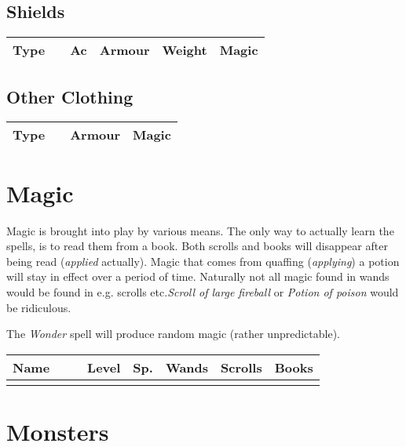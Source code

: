 \documentclass[11pt, a4paper]{article}
\begin{document}
\subsection*{Shields}

{\small 
\begin{center}
\begin{tabular}{|c|c|r|r|r|p{5cm}|}
\hline
Type&&Ac&Armour&Weight&Magic\\
\hline
\hline

\hline
\end{tabular}
\end{center} 
}

\subsection*{Other Clothing}

{\small 
\begin{center}
\begin{tabular}{|c|c|r|l|}
\hline
Type&&Armour&Magic\\
\hline
\hline

\hline
\end{tabular}
\end{center} 
}

\section*{Magic}

Magic is brought into play by various means.  The only way to actually 
learn the spells, is to read them from a book. Both scrolls and books
will disappear after being read ({\em applied} actually). Magic that
comes from quaffing ({\em applying}) a potion will stay in effect over
a period of time. Naturally not all magic found in wands
would be found in e.g. scrolls etc.{\it Scroll of large fireball} or
{\it Potion of poison} would be ridiculous.

The {\it Wonder} spell will produce random magic (rather unpredictable).

{\small 
\begin{longtable}{|l|c|c|r|r|c|c|c|} 
\hline
Name& & &Level&Sp.&Wands&Scrolls&Books\\
\hline 
\hline
\endhead
\hline
\endfoot

\end{longtable} 
}

\section*{Monsters}
\end{document}
